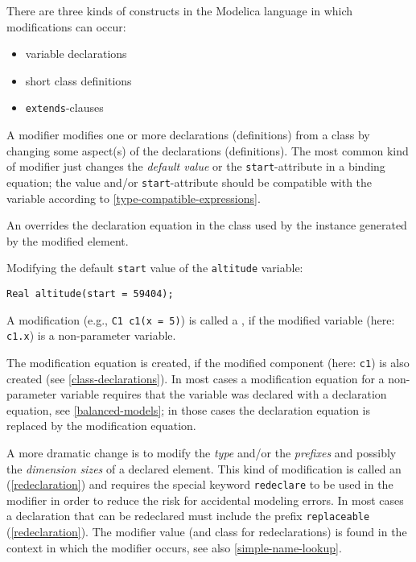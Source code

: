 There are three kinds of constructs in the Modelica language in which modifications can occur:
\begin{itemize}
\item
  variable declarations
\item
  short class definitions
\item
  \lstinline!extends!-clauses
\end{itemize}

A modifier modifies one or more declarations (definitions) from a class by changing some aspect(s) of the declarations (definitions).
The most common kind of modifier just changes the \emph{default value} or the \lstinline!start!-attribute in a binding equation; the value and/or \lstinline!start!-attribute should be compatible with the variable according to \cref{type-compatible-expressions}.

An  overrides the declaration equation in the class used by the instance generated by the modified element.

\begin{example}
Modifying the default \lstinline!start! value of the \lstinline!altitude! variable:
\begin{lstlisting}[language=modelica]
Real altitude(start = 59404);
\end{lstlisting}
\end{example}

A modification (e.g., \lstinline!C1 c1(x = 5)!) is called a , if the modified variable (here: \lstinline!c1.x!) is a non-parameter variable.

\begin{nonnormative}
The modification equation is created, if the modified component (here: \lstinline!c1!) is also created (see \cref{class-declarations}). In most cases
a modification equation for a non-parameter variable requires that the variable was declared with a declaration equation, see \cref{balanced-models};
in those cases the declaration equation is replaced by the modification equation.
\end{nonnormative}

A more dramatic change is to modify the \emph{type} and/or the \emph{prefixes} and possibly the \emph{dimension sizes} of a declared element.
This kind of modification is called an  (\cref{redeclaration}) and requires the special keyword \lstinline!redeclare! to be used in the modifier in order to reduce the risk for accidental modeling errors.
In most cases a declaration that can be redeclared must include the prefix \lstinline!replaceable! (\cref{redeclaration}).
The modifier value (and class for redeclarations) is found in the context in which the modifier occurs, see also \cref{simple-name-lookup}.

